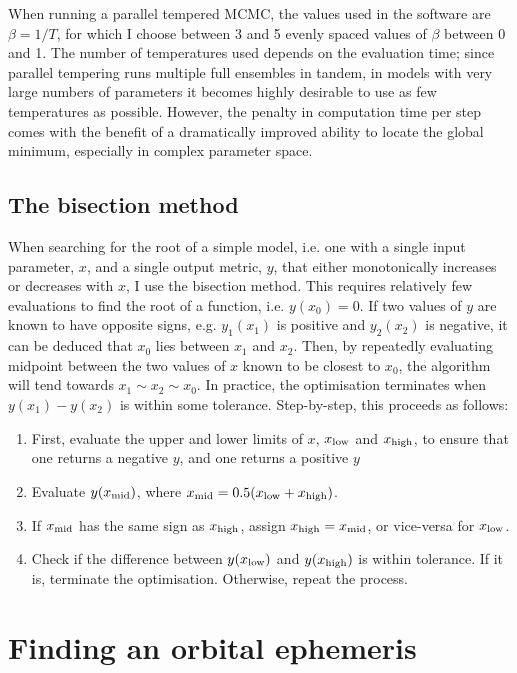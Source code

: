 When running a parallel tempered MCMC, the values used in the software are $\beta = 1/T$, for which I choose between 3 and 5 evenly spaced values of $\beta$ between 0 and 1.
The number of temperatures used depends on the evaluation time; since parallel tempering runs multiple full ensembles in tandem, in models with very large numbers of parameters it becomes highly desirable to use as few temperatures as possible. However, the penalty in computation time per step comes with the benefit of a dramatically improved ability to locate the global minimum, especially in complex parameter space.

\subsection{The bisection method}
\label{sect:modelling:bisection method methodology}

When searching for the root of a simple model, i.e. one with a single input parameter, $x$, and a single output metric, $y$, that either monotonically increases or decreases with $x$, I use the bisection method.
This requires relatively few evaluations to find the root of a function, i.e. $y(x_0) = 0$.
If two values of $y$ are known to have opposite signs, e.g. $y_1(x_1)$ is positive and $y_2(x_2)$ is negative, it can be deduced that $x_0$ lies between $x_1$ and $x_2$. Then, by repeatedly evaluating midpoint between the two values of $x$ known to be closest to $x_0$, the algorithm will tend towards $x_1 \sim x_2 \sim x_0$. In practice, the optimisation terminates when $y(x_1) - y(x_2)$ is within some tolerance.
Step-by-step, this proceeds as follows:
\begin{enumerate}
    \setlength\itemsep{0em}
    \item First, evaluate the upper and lower limits of $x$, $x_{\rm low}$ and $x_{\rm high}$, to ensure that one returns a negative $y$, and one returns a positive $y$
    \item Evaluate $y(x_{\rm mid})$, where $x_{\rm mid} = 0.5(x_{\rm low} + x_{\rm high})$.
    \item If $x_{\rm mid}$ has the same sign as $x_{\rm high}$, assign $x_{\rm high} = x_{\rm mid}$, or vice-versa for $x_{\rm low}$.
    \item Check if the difference between $y(x_{\rm low})$ and $y(x_{\rm high})$ is within tolerance. If it is, terminate the optimisation. Otherwise, repeat the process.
\end{enumerate}


\section{Finding an orbital ephemeris}
\label{sect:modelling:getting ephemeris}

